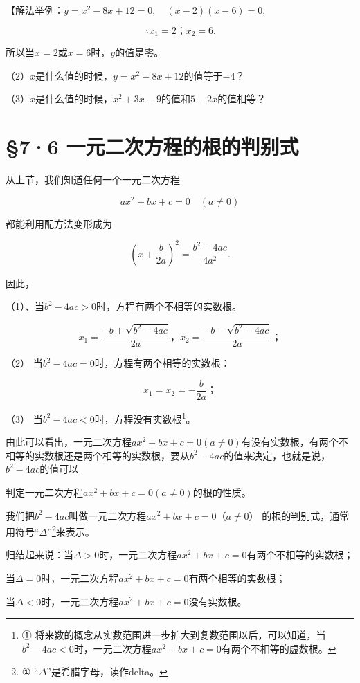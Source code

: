 【解法举例：\(y=x^{2}-8x+12=0,\quad(x-2)(x-6)=0,\)

\[
\therefore x _ {1} = 2\text{；} x _ {2} = 6.
\]

所以当\(x = 2\)或\(x = 6\)时，\(y\)的值是零。

（2）\(x\)是什么值的时候，\(y = x^{2} - 8x + 12\)的值等于\(-4\)？

（3）\(x\)是什么值的时候，\(x^{2} + 3x - 9\)的值和\(5 - 2x\)的值相等？

\section{§7·6 一元二次方程的根的判别式}

从上节，我们知道任何一个一元二次方程

\[
a x ^ {2} + b x + c = 0 \quad (a \neq 0)
\]

都能利用配方法变形成为

\[
\left(x + \frac{b}{2 a}\right) ^ {2} = \frac{b ^ {2} - 4 a c}{4 a ^ {2}}.
\]

因此，

（1）、当\(b^{2}-4ac>0\)时，方程有两个不相等的实数根。

\[
x _ {1} = \frac{- b + \sqrt {b ^ {2} - 4 a c}}{2 a}\text{，} x _ {2} = \frac{- b - \sqrt {b ^ {2} - 4 a c}}{2 a}\text{；}
\]

（2） 当\(b^{2} - 4ac = 0\)时，方程有两个相等的实数根：

\[
x _ {1} = x _ {2} = - \frac{b}{2 a}\text{；}
\]

（3） 当\(b^{2} - 4ac < 0\)时，方程没有实数根\footnote{①
  将来数的概念从实数范围进一步扩大到复数范围以后，可以知道，当\(b^{2}-4ac<0\)时，一元二次方程\(ax^{2}+bx+c=0\)有两个不相等的虚数根。}。

由此可以看出，一元二次方程\(ax^{2}+bx+c=0(a\neq0)\)有没有实数根，有两个不相等的实数根还是两个相等的实数根，要从\(b^{2}-4ac\)的值来决定，也就是说，\(b^{2}-4ac\)的值可以

判定一元二次方程\(ax^2 + bx + c = 0 (a \neq 0)\)的根的性质。

我们把\(b^{2} - 4ac\)叫做一元二次方程\(ax^2 + bx + c = 0\)（\(a \neq 0\)）
的根的判别式，通常用符号``\(\Delta\)''\footnote{①
  ``\(\Delta\)''是希腊字母，读作delta。}来表示。

归结起来说：当\(\Delta > 0\)时，一元二次方程\(ax^2 + bx + c = 0\)有两个不相等的实数根；

当\(\Delta = 0\)时，一元二次方程\(ax^2 + bx + c = 0\)有两个相等的实数根；

当\(\Delta < 0\)时，一元二次方程\(ax^2 + bx + c = 0\)没有实数根。

